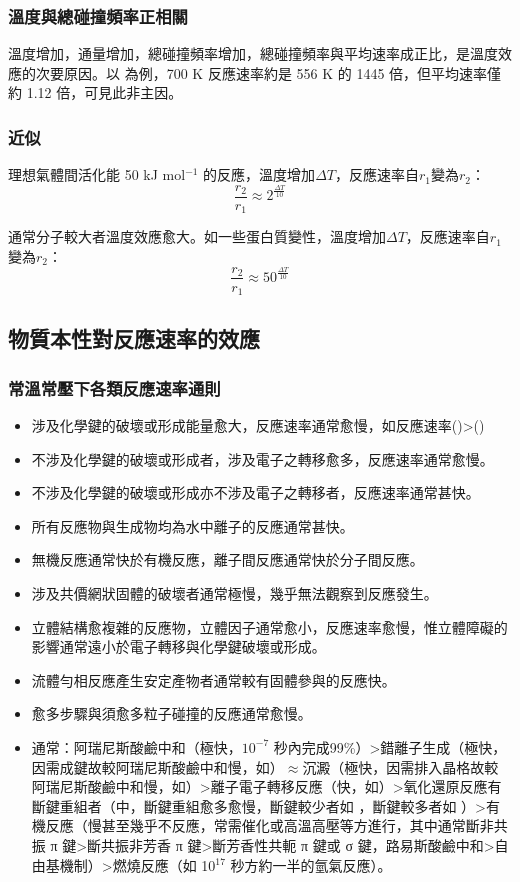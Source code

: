 \documentclass[a4paper,12pt]{report}
\begin{document}
\subsubsection{溫度與總碰撞頻率正相關}
溫度增加，通量增加，總碰撞頻率增加，總碰撞頻率與平均速率成正比，是溫度效應的次要原因。以  為例，700 K 反應速率約是 556 K 的 1445 倍，但平均速率僅約 1.12 倍，可見此非主因。
\subsubsection{近似}
理想氣體間活化能 50 kJ mol$^{-1}$ 的反應，溫度增加$\Delta T$，反應速率自$r_1$變為$r_2$：
\[\frac{r_2}{r_1} \approx 2^{\frac{\Delta T}{10}}\]

通常分子較大者溫度效應愈大。如一些蛋白質變性，溫度增加$\Delta T$，反應速率自$r_1$變為$r_2$：
\[\frac{r_2}{r_1} \approx 50^{\frac{\Delta T}{10}}\]
\subsection{物質本性對反應速率的效應}
\subsubsection{常溫常壓下各類反應速率通則}
\begin{itemize}
\item 涉及化學鍵的破壞或形成能量愈大，反應速率通常愈慢，如反應速率()>()
\item 不涉及化學鍵的破壞或形成者，涉及電子之轉移愈多，反應速率通常愈慢。
\item 不涉及化學鍵的破壞或形成亦不涉及電子之轉移者，反應速率通常甚快。
\item 所有反應物與生成物均為水中離子的反應通常甚快。
\item 無機反應通常快於有機反應，離子間反應通常快於分子間反應。
\item 涉及共價網狀固體的破壞者通常極慢，幾乎無法觀察到反應發生。
\item 立體結構愈複雜的反應物，立體因子通常愈小，反應速率愈慢，惟立體障礙的影響通常遠小於電子轉移與化學鍵破壞或形成。
\item 流體勻相反應產生安定產物者通常較有固體參與的反應快。
\item 愈多步驟與須愈多粒子碰撞的反應通常愈慢。
\item 通常：阿瑞尼斯酸鹼中和（極快，$10^{-7}$ 秒內完成99\%）>錯離子生成（極快，因需成鍵故較阿瑞尼斯酸鹼中和慢，如）$\approx$沉澱（極快，因需排入晶格故較阿瑞尼斯酸鹼中和慢，如）>離子電子轉移反應（快，如）>氧化還原反應有斷鍵重組者（中，斷鍵重組愈多愈慢，斷鍵較少者如 ，斷鍵較多者如 ）>有機反應（慢甚至幾乎不反應，常需催化或高溫高壓等方進行，其中通常斷非共振 π 鍵>斷共振非芳香 π 鍵>斷芳香性共軛 π 鍵或 σ 鍵，路易斯酸鹼中和>自由基機制）>燃燒反應（如  10$^{17}$ 秒方約一半的氫氣反應）。
\end{itemize}
\end{document}
